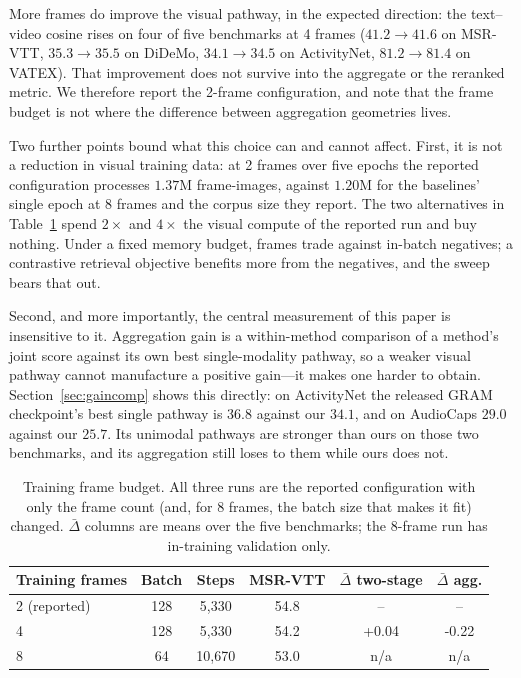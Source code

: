 \documentclass[10pt,twocolumn,letterpaper]{article}
\begin{document}
More frames do improve the visual pathway, in the expected direction: the
text--video cosine rises on four of five benchmarks at 4 frames ($41.2
\rightarrow 41.6$ on MSR-VTT, $35.3 \rightarrow 35.5$ on DiDeMo, $34.1
\rightarrow 34.5$ on ActivityNet, $81.2 \rightarrow 81.4$ on VATEX). That
improvement does not survive into the aggregate or the reranked metric. We
therefore report the 2-frame configuration, and note that the frame budget is
not where the difference between aggregation geometries lives.

Two further points bound what this choice can and cannot affect. First, it is
not a reduction in visual training data: at 2 frames over five epochs the
reported configuration processes $1.37$M frame-images, against $1.20$M for the
baselines' single epoch at 8 frames and the corpus size they report. The two
alternatives in Table~\ref{tab:frames} spend $2\times$ and $4\times$ the
visual compute of the reported run and buy nothing. Under a fixed memory
budget, frames trade against in-batch negatives; a contrastive retrieval
objective benefits more from the negatives, and the sweep bears that out.

Second, and more importantly, the central measurement of this paper is
insensitive to it. Aggregation gain is a within-method comparison of a
method's joint score against its own best single-modality pathway, so a weaker
visual pathway cannot manufacture a positive gain---it makes one harder to
obtain. Section~\ref{sec:gaincomp} shows this directly: on ActivityNet the
released GRAM checkpoint's best single pathway is $36.8$ against our $34.1$,
and on AudioCaps $29.0$ against our $25.7$. Its unimodal pathways are stronger
than ours on those two benchmarks, and its aggregation still loses to them
while ours does not.

\begin{table}[t]
\centering
\caption{Training frame budget. All three runs are the reported configuration
with only the frame count (and, for 8 frames, the batch size that makes it fit)
changed. $\bar{\Delta}$ columns are means over the five benchmarks; the
8-frame run has in-training validation only.}
\label{tab:frames}
\small
\setlength{\tabcolsep}{4pt}
\begin{tabular}{lccccc}
\toprule
Training frames & Batch & Steps & MSR-VTT & $\bar{\Delta}$ two-stage & $\bar{\Delta}$ agg. \\
\midrule
2 (reported) & 128 & 5{,}330 & 54.8 & -- & -- \\
4 & 128 & 5{,}330 & 54.2 & +0.04 & -0.22 \\
8 & 64 & 10{,}670 & 53.0 & n/a & n/a \\
\bottomrule
\end{tabular}
\end{table}
\end{document}
